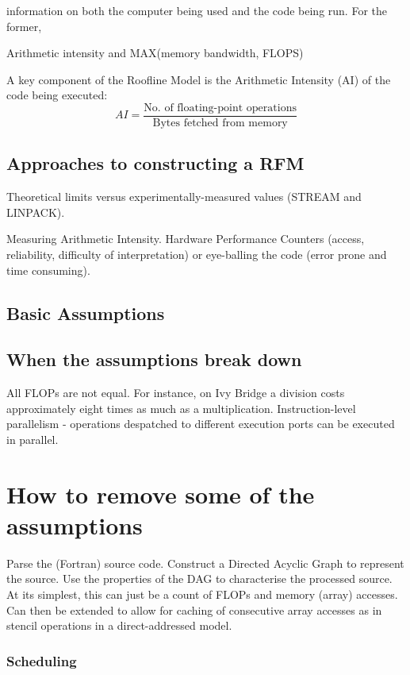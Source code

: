 \documentclass[12pt]{article}
\begin{document}
information on both the
computer being used and the code being run. For the former,

Arithmetic intensity and MAX(memory bandwidth, FLOPS)

A key component of the Roofline Model is the Arithmetic Intensity (AI)
of the code being executed:
\begin{equation}
AI = \frac{\textrm{No. of floating-point operations}}{\textrm{Bytes fetched from memory}}
\end{equation}

\subsection{Approaches to constructing a RFM}

Theoretical limits versus experimentally-measured values (STREAM and
LINPACK).

Measuring Arithmetic Intensity. Hardware Performance Counters (access,
reliability, difficulty of interpretation) or eye-balling the code
(error prone and time consuming).

\subsection{Basic Assumptions}
\subsection{When the assumptions break down}

All FLOPs are not equal. For instance, on Ivy Bridge a division costs
approximately eight times as much as a multiplication.
Instruction-level parallelism - operations despatched to different
execution ports can be executed in parallel.

\section{How to remove some of the assumptions}

Parse the (Fortran) source code.  Construct a Directed Acyclic Graph
to represent the source.  Use the properties of the DAG to
characterise the processed source.  At its simplest, this can just be
a count of FLOPs and memory (array) accesses.  Can then be extended to
allow for caching of consecutive array accesses as in stencil
operations in a direct-addressed model.

\subsubsection{Scheduling}
\end{document}
